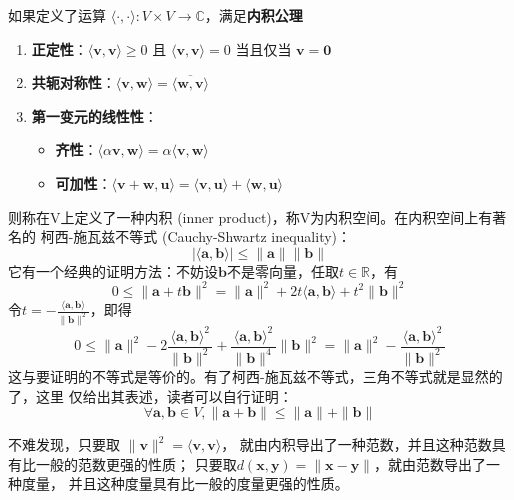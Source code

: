 \documentclass{ctexbook}
\begin{document}
如果定义了运算
$\langle \cdot,\cdot\rangle:V\times V\rightarrow \mathbb{C} $，满足\textbf{内积公理}
\begin{enumerate}
    \item \textbf{正定性}：$\langle \mathbf{v}, \mathbf{v} \rangle \geq 0$ 且 $\langle \mathbf{v}, \mathbf{v} \rangle = 0$ 当且仅当 $\mathbf{v} = \mathbf{0}$
    \item \textbf{共轭对称性}：$\langle \mathbf{v}, \mathbf{w} \rangle = \overline{\langle \mathbf{w}, \mathbf{v} \rangle}$
    \item \textbf{第一变元的线性性}：
          \begin{itemize}
              \item \textbf{齐性}：$\langle \alpha \mathbf{v}, \mathbf{w} \rangle = \alpha \langle \mathbf{v}, \mathbf{w} \rangle$
              \item \textbf{可加性}：$\langle \mathbf{v} + \mathbf{w}, \mathbf{u} \rangle = \langle \mathbf{v}, \mathbf{u} \rangle + \langle \mathbf{w}, \mathbf{u} \rangle$
          \end{itemize}
\end{enumerate}
则称在V上定义了一种内积 (inner product)，称V为内积空间。在内积空间上有著名的
柯西-施瓦兹不等式 (Cauchy-Shwartz inequality)：
\[|\langle \mathbf{a,b}\rangle| \leq \| \mathbf{a}\| \| \mathbf{b}\| \]
它有一个经典的证明方法：不妨设$\mathbf{b}$不是零向量，任取$t\in \mathbb{R}$，有
\[0\leq \|\mathbf{a}+t\mathbf{b}\|^2=\|\mathbf{a}\|^2+2t\langle\mathbf{a,b}\rangle +t^2\|\mathbf{b}\|^2\]
令$t=-\frac{\langle\mathbf{a,b}\rangle}{\|\mathbf{b}\|^2}$，即得
\[0\leq \|\mathbf{a}\|^2-2\frac{\langle\mathbf{a,b}\rangle^2}{\|\mathbf{b}\|^2} +\frac{\langle\mathbf{a,b}\rangle^2}{\|\mathbf{b}\|^4}\|\mathbf{b}\|^2=\|\mathbf{a}\|^2-\frac{\langle\mathbf{a,b}\rangle^2}{\|\mathbf{b}\|^2}\]
这与要证明的不等式是等价的。有了柯西-施瓦兹不等式，三角不等式就是显然的了，这里
仅给出其表述，读者可以自行证明：
\[\forall \mathbf{a,b}\in V,\|\mathbf{a+b}\|\leq\|\mathbf{a}\|+\|\mathbf{b}\|\]

不难发现，只要取
$\|\mathbf{v}\|^2=\langle \mathbf{v}, \mathbf{v} \rangle$，
就由内积导出了一种范数，并且这种范数具有比一般的范数更强的性质；
只要取$d(\mathbf{x},\mathbf{y})=\|\mathbf{x-y}\|$，就由范数导出了一种度量，
并且这种度量具有比一般的度量更强的性质。
\end{document}
